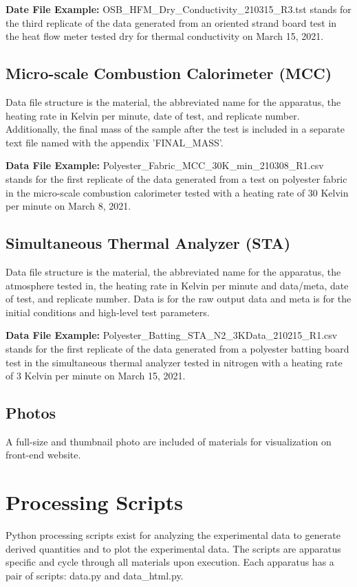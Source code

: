 \documentclass[12pt,oneside]{book}
\begin{document}
{\bf Date File Example:} OSB\_HFM\_Dry\_Conductivity\_210315\_R3.tst stands for the third replicate of the data generated from an oriented strand board test in the heat flow meter tested dry for thermal conductivity on March 15, 2021.

\subsection{Micro-scale Combustion Calorimeter (MCC)}
Data file structure is the material, the abbreviated name for the apparatus, the heating rate in Kelvin per minute, date of test, and replicate number. Additionally, the final mass of the sample after the test is included in a separate text file named with the appendix 'FINAL\_MASS'.

{\bf Data File Example:} Polyester\_Fabric\_MCC\_30K\_min\_210308\_R1.csv stands for the first replicate of the data generated from a test on polyester fabric in the micro-scale combustion calorimeter tested with a heating rate of 30 Kelvin per minute on March 8, 2021.

\subsection{Simultaneous Thermal Analyzer (STA)}
Data file structure is the material, the abbreviated name for the apparatus, the atmosphere tested in, the heating rate in Kelvin per minute and data/meta, date of test, and replicate number. Data is for the raw output data and meta is for the initial conditions and high-level test parameters.

{\bf Data File Example:} Polyester\_Batting\_STA\_N2\_3KData\_210215\_R1.csv stands for the first replicate of the data generated from a polyester batting board test in the simultaneous thermal analyzer tested in nitrogen with a heating rate of 3 Kelvin per minute on March 15, 2021.

\subsection{Photos}
A full-size and thumbnail photo are included of materials for visualization on front-end website.


\section{Processing Scripts}
\label{sec:scripts}

Python processing scripts exist for analyzing the experimental data to generate derived quantities and to plot the experimental data. The scripts are apparatus specific and cycle through all materials upon execution. Each apparatus has a pair of scripts: data.py and data\_html.py.
\end{document}
